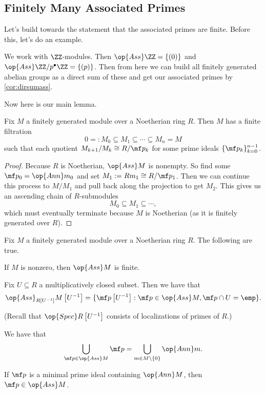 \subsection{Finitely Many Associated Primes}
Let's build towards the statement that the associated primes are finite. Before this, let's do an example.
\begin{ex}
	We work with $\ZZ$-modules. Then $\op{Ass}\ZZ=\{(0)\}$ and $\op{Ass}\ZZ/p^\bullet\ZZ=\{(p)\}$. Then from here we can build all finitely generated abelian groups as a direct sum of these and get our associated primes by \autoref{cor:dirsumass}.
\end{ex}
Now here is our main lemma.
\begin{lemma} \label{lem:fingenfiltration}
	Fix $M$ a finitely generated module over a Noetherian ring $R$. Then $M$ has a finite filtration
	\[0=:M_0\subseteq M_1\subseteq\cdots\subseteq M_n=M\]
	such that each quotient $M_{k+1}/M_k\cong R/\mf p_k$ for some prime ideals $\{\mf p_k\}_{k=0}^{n-1}$.
\end{lemma}
\begin{proof}
	Because $R$ is Noetherian, $\op{Ass}M$ is nonempty. So find some $\mf p_0=\op{Ann}m_0$ and set $M_1:=Rm_1\cong R/\mf p_1$. Then we can continue this process to $M/M_1$ and pull back along the projection to get $M_2$. This gives us an ascending chain of $R$-submodules
	\[M_0\subseteq M_1\subseteq\cdots,\]
	which must eventually terminate because $M$ is Noetherian (as it is finitely generated over $R$).
\end{proof}
\begin{theorem}
	Fix $M$ a finitely generated module over a Noetherian ring $R$. The following are true.
	\begin{listalph}
		\item If $M$ is nonzero, then $\op{Ass}M$ is finite.
		\item Fix $U\subseteq R$ a multiplicatively closed subset. Then we have that
		\[\op{Ass}_{R\left[U^{-1}\right]}M\left[U^{-1}\right]=\{\mf p\left[U^{-1}\right]:\mf p\in\op{Ass}M,\mf p\cap U=\emp\}.\]

		(Recall that $\op{Spec}R\left[U^{-1}\right]$ consists of localizations of primes of $R$.)
		\item We have that
		\[\bigcup_{\mf p\in\op{Ass}M}\mf p=\bigcup_{m\in M\setminus\{0\}}\op{Ann}m.\]
		\item If $\mf p$ is a minimal prime ideal containing $\op{Ann}M$, then $\mf p\in\op{Ass}M$.
	\end{listalph}
\end{theorem}
